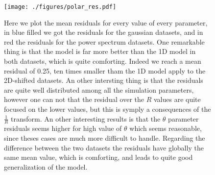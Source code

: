 \documentclass[11pt,a4paper,openany]{report}
\begin{document}
\begin{figure}[H]
    \centering
    \texttt{[image: ./figures/polar\_res.pdf]}
    \caption{Here we plot the mean residuals for every value of every parameter, in blue filled we got the residuals for the gaussian datasets, and in red the residuals for the power spectrum datasets. One remarkable thing is that the model is far more better than the 1D model in both datasets, which is quite comforting. Indeed we reach a mean residual of 0.25, ten times smaller tham the 1D model apply to the 2D-shifted datasets. An other intersting thing is that the residuals are quite well distributed among all the simulation parameters, however one can not that the residual over the $R$ values are quite focused on the lower values, but this is symply a consequences of the $\frac{1}{R}$ transform. An other interesting results is that the $\theta$ parameter residuals seems higher for high value of $\theta$ which seems reasonable, since theses cases are much more difficult to handle. Regarding the difference between the two datasets the residuals have globally the same mean value, which is comforting, and leads to quite good generalization of the model.}
\end{figure}
\end{document}
